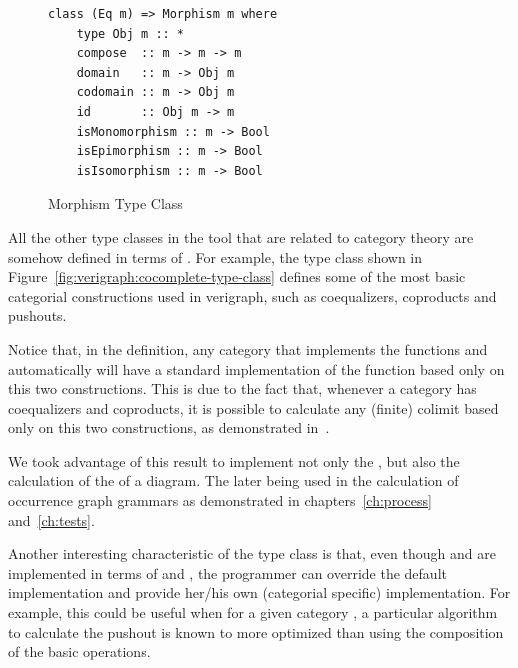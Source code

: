 \begin{figure}[!ht]
\caption{Morphism Type Class}
\begin{verbatim}
class (Eq m) => Morphism m where
    type Obj m :: *
    compose  :: m -> m -> m
    domain   :: m -> Obj m
    codomain :: m -> Obj m
    id       :: Obj m -> m
    isMonomorphism :: m -> Bool
    isEpimorphism :: m -> Bool
    isIsomorphism :: m -> Bool
\end{verbatim}
\label{fig:verigraph:morphism-type-class}
\end{figure}

All the other type classes in the tool that are related to category theory are somehow defined in terms of . For example, the  type class shown in Figure~\ref{fig:verigraph:cocomplete-type-class} defines some of the most basic categorial constructions used in verigraph, such as coequalizers, coproducts and pushouts.

Notice that, in the  definition, any category that implements the functions  and  automatically will have a standard implementation of the  function based only on this two constructions. This is due to the fact that, whenever a category has coequalizers and coproducts, it is possible to calculate any (finite) colimit based only on this two constructions, as demonstrated in~\cite{Pierce1991}.

We took advantage of this result to implement not only the , but also the calculation of the  of a diagram. The later being used in the calculation of occurrence graph grammars as demonstrated in chapters~\ref{ch:process} and~\ref{ch:tests}.

Another interesting characteristic of the  type class is that, even though  and  are implemented in terms of  and , the programmer can override the default implementation and provide her/his own (categorial specific) implementation. For example, this could be useful when for a given category , a particular algorithm to calculate the pushout is known to more optimized than using the composition of the basic operations.

